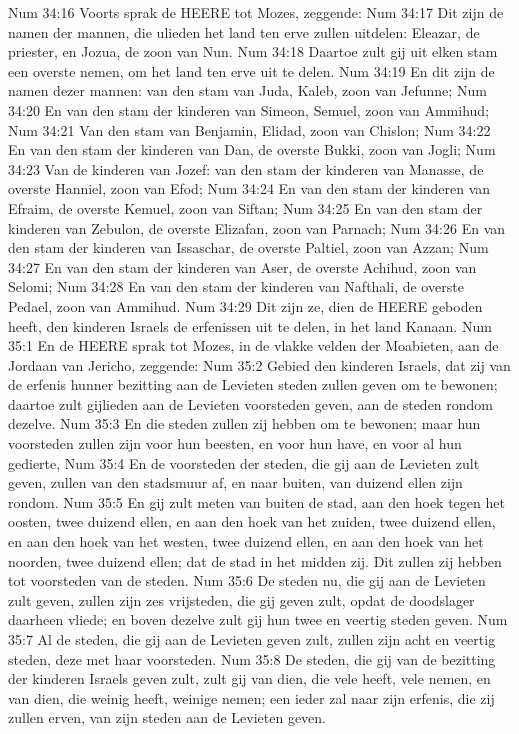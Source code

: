 Num 34:16  Voorts sprak de HEERE tot Mozes, zeggende:
Num 34:17  Dit zijn de namen der mannen, die ulieden het land ten erve zullen uitdelen: Eleazar, de priester, en Jozua, de zoon van Nun.
Num 34:18  Daartoe zult gij uit elken stam een overste nemen, om het land ten erve uit te delen.
Num 34:19  En dit zijn de namen dezer mannen: van den stam van Juda, Kaleb, zoon van Jefunne;
Num 34:20  En van den stam der kinderen van Simeon, Semuel, zoon van Ammihud;
Num 34:21  Van den stam van Benjamin, Elidad, zoon van Chislon;
Num 34:22  En van den stam der kinderen van Dan, de overste Bukki, zoon van Jogli;
Num 34:23  Van de kinderen van Jozef: van den stam der kinderen van Manasse, de overste Hanniel, zoon van Efod;
Num 34:24  En van den stam der kinderen van Efraim, de overste Kemuel, zoon van Siftan;
Num 34:25  En van den stam der kinderen van Zebulon, de overste Elizafan, zoon van Parnach;
Num 34:26  En van den stam der kinderen van Issaschar, de overste Paltiel, zoon van Azzan;
Num 34:27  En van den stam der kinderen van Aser, de overste Achihud, zoon van Selomi;
Num 34:28  En van den stam der kinderen van Nafthali, de overste Pedael, zoon van Ammihud.
Num 34:29  Dit zijn ze, dien de HEERE geboden heeft, den kinderen Israels de erfenissen uit te delen, in het land Kanaan.
Num 35:1  En de HEERE sprak tot Mozes, in de vlakke velden der Moabieten, aan de Jordaan van Jericho, zeggende:
Num 35:2  Gebied den kinderen Israels, dat zij van de erfenis hunner bezitting aan de Levieten steden zullen geven om te bewonen; daartoe zult gijlieden aan de Levieten voorsteden geven, aan de steden rondom dezelve.
Num 35:3  En die steden zullen zij hebben om te bewonen; maar hun voorsteden zullen zijn voor hun beesten, en voor hun have, en voor al hun gedierte,
Num 35:4  En de voorsteden der steden, die gij aan de Levieten zult geven, zullen van den stadsmuur af, en naar buiten, van duizend ellen zijn rondom.
Num 35:5  En gij zult meten van buiten de stad, aan den hoek tegen het oosten, twee duizend ellen, en aan den hoek van het zuiden, twee duizend ellen, en aan den hoek van het westen, twee duizend ellen, en aan den hoek van het noorden, twee duizend ellen; dat de stad in het midden zij. Dit zullen zij hebben tot voorsteden van de steden.
Num 35:6  De steden nu, die gij aan de Levieten zult geven, zullen zijn zes vrijsteden, die gij geven zult, opdat de doodslager daarheen vliede; en boven dezelve zult gij hun twee en veertig steden geven.
Num 35:7  Al de steden, die gij aan de Levieten geven zult, zullen zijn acht en veertig steden, deze met haar voorsteden.
Num 35:8  De steden, die gij van de bezitting der kinderen Israels geven zult, zult gij van dien, die vele heeft, vele nemen, en van dien, die weinig heeft, weinige nemen; een ieder zal naar zijn erfenis, die zij zullen erven, van zijn steden aan de Levieten geven.
